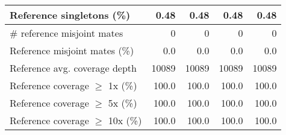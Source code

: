 \documentclass[12pt,a4paper]{article}
\begin{document}
\begin{table}[ht]
\begin{center}
\begin{tabular}{|l*{4}{|r}|}
Reference singletons (\%) & 0.48 & 0.48 & 0.48 & 0.48 \\ \hline
\# reference misjoint mates & 0 & 0 & 0 & 0 \\ \hline
Reference misjoint mates (\%) & 0.0 & 0.0 & 0.0 & 0.0 \\ \hline
Reference avg. coverage depth & 10089 & 10089 & 10089 & 10089 \\ \hline
Reference coverage $\geq$ 1x (\%) & 100.0 & 100.0 & 100.0 & 100.0 \\ \hline
Reference coverage $\geq$ 5x (\%) & 100.0 & 100.0 & 100.0 & 100.0 \\ \hline
Reference coverage $\geq$ 10x (\%) & 100.0 & 100.0 & 100.0 & 100.0 \\ \hline
\end{tabular}
\end{center}
\end{table}
\end{document}

